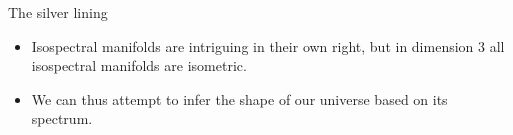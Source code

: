 {

\begin{frame}{The silver lining}
	\begin{itemize}
		\item Isospectral manifolds are intriguing in their own right, but in dimension 3 all isospectral manifolds are isometric.
		\item We can thus attempt to infer the shape of our universe based on its spectrum.
	\end{itemize}
\end{frame}
}
